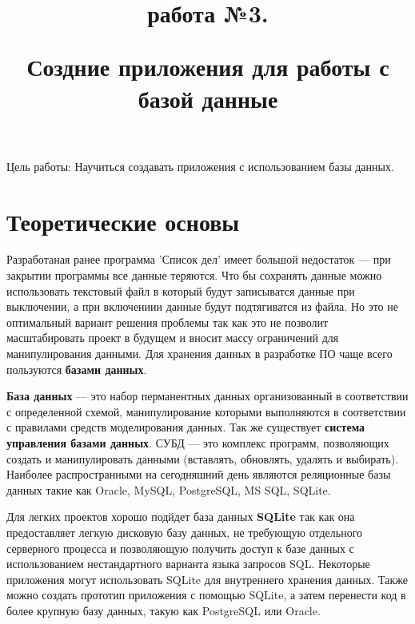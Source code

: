 \documentclass[a4paper]{article}
\title{\bfseriesЛабораторная работа №3.\newline

Создние приложения для работы с базой данные}
\date{}
\begin{document}
\maketitle
\newpage

Цель работы: Научиться создавать приложения с использованием базы данных.

\section{Теоретические основы}

Разработаная ранее программа 'Список дел' имеет большой недостаток --- при закрытии программы все данные теряются. Что бы сохранять данные можно использовать текстовый файл в который будут записыватся данные при выключении, а при включениии данные будут подтягиватся из файла. Но это не оптимальный вариант решения проблемы так как это не позволит масштабировать проект в будущем и вносит массу ограничений для манипулирования данными. Для хранения данных в разработке ПО чаще всего пользуются \textbf{базами данных}.

\textbf{База данных} --- это набор перманентных данных организованный в соответствии с определенной схемой, манипулирование которыми выполняются в соответствии с правилами средств моделирования данных. Так же существует \textbf{система управления базами данных}. СУБД --- это комплекс программ, позволяющих создать и манипулировать данными (вставлять, обновлять, удалять и выбирать). Наиболее распространными на сегодняшний день являются реляционные базы данных такие как Oracle, MySQL, PostgreSQL, MS SQL, SQLite.

Для легких проектов хорошо подйдет база данных \textbf{SQLite} так как она предоставляет легкую дисковую базу данных, не требующую отдельного серверного процесса и позволяющую получить доступ к базе данных с использованием нестандартного варианта языка запросов SQL. Некоторые приложения могут использовать SQLite для внутреннего хранения данных. Также можно создать прототип приложения с помощью SQLite, а затем перенести код в более крупную базу данных, такую как PostgreSQL или Oracle.
\end{document}
